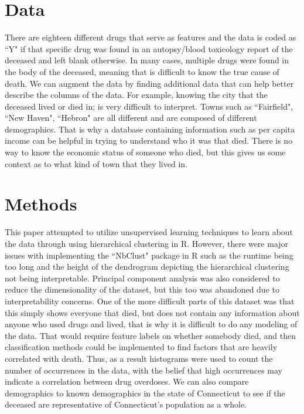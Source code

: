 \documentclass[12pt, letterpaper, titlepage]{article}
\begin{document}
\section{Data} \label{sec:Data}
There are eighteen different drugs that serve as features and the data is coded as ``Y" if that specific drug was found in an autopsy/blood toxicology report of the deceased and left blank otherwise.  In many cases, multiple drugs were found in the body of the deceased, meaning that is difficult to know the true cause of death.  We can augment the data by finding additional data that can help better describe the columns of the data.  For example, knowing the city that the deceased lived or died in; is very difficult to interpret.  Towns such as ``Fairfield", ``New Haven", ``Hebron" are all different and are composed of different demographics.  That is why a database containing information such as per capita income can be helpful in trying to understand who it was that died.  There is no way to know the economic status of someone who died, but this gives us some context as to what kind of town that they lived in.


\section{Methods} \label{sec:Methods}
This paper attempted to utilize unsupervised learning techniques to learn about the data through using hierarchical clustering in R.  However, there were major issues with implementing the ``NbClust" package in R such as the runtime being too long and the height of the dendrogram depicting the hierarchical clustering not being interpretable.  Principal component analysis was also considered to reduce the dimensionality of the dataset, but this too was abandoned due to interpretability concerns.  One of the more difficult parts of this dataset was that this simply shows everyone that died, but does not contain any information about anyone who used drugs and lived, that is why it is difficult to do any modeling of the data.  That would require feature labels on whether somebody died, and then classification methods could be implemented to find factors that are heavily correlated with death.  Thus, as a result histograms were used to count the number of occurrences in the data, with the belief that high occurrences may indicate a correlation between drug overdoses.  We can also compare demographics to known demographics in the state of Connecticut to see if the deceased are representative of Connecticut's population as a whole.
\end{document}
